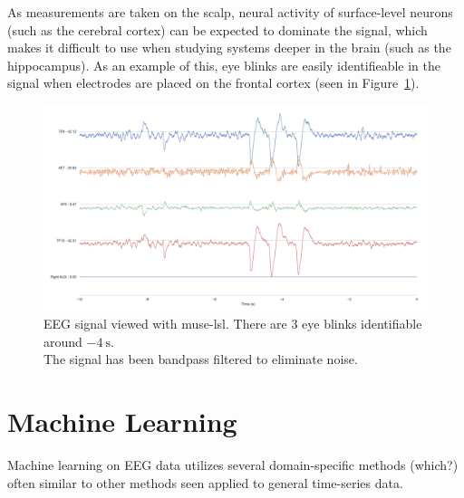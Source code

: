    As measurements are taken on the scalp, neural activity of surface-level neurons (such as the cerebral cortex) can be expected to dominate the signal, which makes it difficult to use when studying systems deeper in the brain (such as the hippocampus). As an example of this, eye blinks are easily identifieable in the signal when electrodes are placed on the frontal cortex (seen in Figure~\ref{fig:muselsl-signal}).



    \begin{landscape}
        \begin{figure}
            \begin{center}
                \includegraphics[trim=60 50 50 60,clip,width=22cm]{img/muselsl-signal.png}
            \end{center}
            \caption{EEG signal viewed with muse-lsl. There are 3 eye blinks identifiable around $\SI{-4}{\second}$.\\ The signal has been bandpass filtered to eliminate noise.}\label{fig:muselsl-signal}
        \end{figure}
    \end{landscape}

\section{Machine Learning}

    Machine learning on EEG data utilizes several domain-specific methods (which?) often similar to other methods seen applied to general time-series data.

